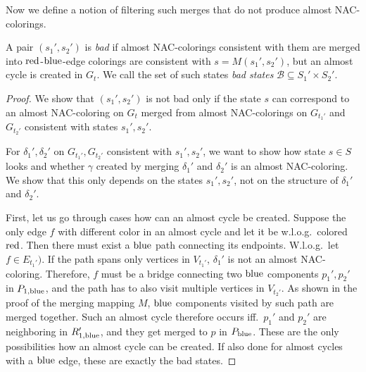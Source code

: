 Now we define a notion of filtering
such merges that do not produce almost NAC-colorings.
%
\begin{definition}
	A pair \( (s_1', s_2') \) is \emph{bad}
	if almost NAC-colorings consistent with them are merged
	into \( \text{red} \)-\( \text{blue} \)-edge colorings are consistent with \( s = M(s_1', s_2') \),
	but an almost cycle is created in \( G_t \).
	We call the set of such states \emph{bad states} \( \mathcal{B} \subseteq S_1' \times S_2' \).
\end{definition}
%
%
\begin{proof}
	We show that \( (s_1', s_2') \) is not bad only if the state \( s \)
	can correspond to an almost NAC-coloring on \( G_t \)
	merged from almost NAC-colorings on \( G_{t_1'} \) and \( G_{t_2'} \)
	consistent with states \( s_1', s_2' \).

	For \( \delta_1', \delta_2' \) on \( G_{t_1'}, G_{t_2'} \)
	consistent with \( s_1', s_2' \),
	we want to show how state \( s \in S \) looks and
	whether \( \gamma \) created by merging \( \delta_1' \) and \( \delta_2' \)
	is an almost NAC-coloring.
	We show that this only depends on the states \( s_1', s_2' \),
	not on the structure of \( \delta_1' \) and \( \delta_2' \).

	First, let us go through cases how can an almost cycle be created.
	Suppose the only edge \( f \) with different color
	in an almost cycle and let it be w.l.o.g.\ colored \( \text{red} \).
	Then there must exist a \( \text{blue} \) path connecting its endpoints.
	W.l.o.g.\ let \( f \in E_{t_1'}) \).
	If the path spans only vertices
	in \( V_{t_1'} \), \( \delta_1' \) is not an almost NAC-coloring.
	Therefore, \( f \) must be
	a bridge connecting two \( \text{blue} \) components \( p_1', p_2' \) in \( P_{1,\text{blue}} \),
	and the path has to also visit multiple vertices in \( V_{t_2'} \).
	As shown in the proof of the merging mapping \( M \), \( \text{blue} \) components
	visited by such path are merged together.
	Such an almost cycle therefore occurs
	iff.\ \( p_1' \) and \( p_2' \) are neighboring in \( R_{1,\text{blue}}' \),
	and they get merged to \( p \) in \( P_{\text{blue}} \).
	These are the only possibilities how an almost cycle can be created.
	If also done for almost cycles with a \( \text{blue} \) edge,
	these are exactly the bad states.
\end{proof}
%

